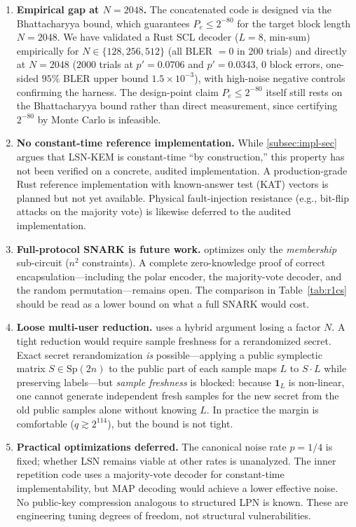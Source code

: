 \documentclass[11pt,a4paper]{article}
\theoremstyle{plain}
\theoremstyle{definition}
\begin{document}
\begin{enumerate}
\item \textbf{Empirical gap at $N=2048$.} The concatenated code is designed via the Bhattacharyya bound, which guarantees $P_e\leq 2^{-80}$ for the target block length $N=2048$. We have validated a Rust SCL decoder ($L=8$, min-sum) empirically for $N\in\{128,256,512\}$ (all BLER $=0$ in 200 trials) and directly at $N=2048$ ($2000$ trials at $p'=0.0706$ and $p'=0.0343$, $0$ block errors, one-sided $95\%$ BLER upper bound $1.5\times10^{-3}$), with high-noise negative controls confirming the harness. The design-point claim $P_e\leq 2^{-80}$ itself still rests on the Bhattacharyya bound rather than direct measurement, since certifying $2^{-80}$ by Monte Carlo is infeasible.

\item \textbf{No constant-time reference implementation.} While \cref{subsec:impl-sec} argues that LSN-KEM is constant-time ``by construction,'' this property has not been verified on a concrete, audited implementation. A production-grade Rust reference implementation with known-answer test (KAT) vectors is planned but not yet available. Physical fault-injection resistance (e.g., bit-flip attacks on the majority vote) is likewise deferred to the audited implementation.

\item \textbf{Full-protocol SNARK is future work.}  optimizes only the \emph{membership} sub-circuit ($n^2$ constraints). A complete zero-knowledge proof of correct encapsulation---including the polar encoder, the majority-vote decoder, and the random permutation---remains open. The comparison in Table~\ref{tab:r1cs} should be read as a lower bound on what a full SNARK would cost.

\item \textbf{Loose multi-user reduction.}  uses a hybrid argument losing a factor $N$. A tight reduction would require sample freshness for a rerandomized secret. Exact secret rerandomization \emph{is} possible---applying a public symplectic matrix $S \in \mathrm{Sp}(2n)$ to the public part of each sample maps $L$ to $S\cdot L$ while preserving labels---but \emph{sample freshness} is blocked: because $\mathbf{1}_L$ is non-linear, one cannot generate independent fresh samples for the new secret from the old public samples alone without knowing $L$. In practice the margin is comfortable ($q\gtrsim 2^{114}$), but the bound is not tight.

\item \textbf{Practical optimizations deferred.} The canonical noise rate $p=1/4$ is fixed; whether LSN remains viable at other rates is unanalyzed. The inner repetition code uses a majority-vote decoder for constant-time implementability, but MAP decoding would achieve a lower effective noise. No public-key compression analogous to structured LPN is known. These are engineering tuning degrees of freedom, not structural vulnerabilities.
\end{enumerate}
\end{document}
